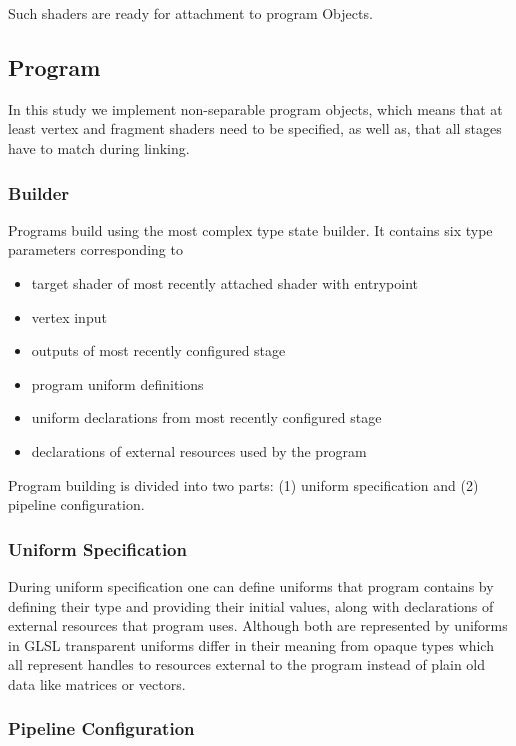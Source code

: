 Such shaders are ready for attachment to program Objects.

\subsection{Program}

In this study we implement non-separable program objects, which means that at least vertex and fragment shaders need to be specified, as well as, that all stages have to match during linking.

\subsubsection{Builder}

Programs build using the most complex type state builder. It contains six type parameters corresponding to
\begin{itemize}
    \item target shader of most recently attached shader with entrypoint
    \item vertex input
    \item outputs of most recently configured stage
    \item program uniform definitions
    \item uniform declarations from most recently configured stage
    \item declarations of external resources used by the program
\end{itemize}

Program building is divided into two parts: (1) uniform specification and (2) pipeline configuration.


\subsubsection{Uniform Specification}

During uniform specification one can define uniforms that program contains by defining their type and providing their initial values, along with declarations of external resources that program uses.
Although both are represented by uniforms in GLSL transparent uniforms differ in their meaning from opaque types which all represent handles to resources external to the program
instead of plain old data like matrices or vectors.

\subsubsection{Pipeline Configuration}

